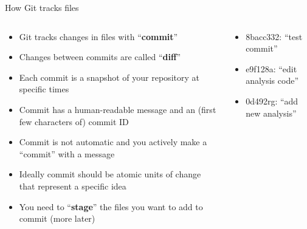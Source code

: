 \documentclass[handout,pdftex,10pt,aspectratio=169]{beamer}
\begin{document}
\begin{frame}{How Git tracks files}
  \begin{columns}[c]
    \begin{column}{0.46\linewidth}
      \begin{itemize}[<+->] \setlength\itemsep{10pt}
        \item Git tracks changes in files with ``\textbf{commit}''
        \item Changes between commits are called ``\textbf{diff}''
        \item Each commit is a snapshot of your repository at specific times
        \item Commit has a human-readable message and an (first few characters of) commit ID
        \item Commit is not automatic and you actively make a ``commit'' with a message
        \item Ideally commit should be atomic units of change that represent a specific idea
        \item You need to ``\textbf{stage}'' the files you want to add to commit (more later)
      \end{itemize}
    \end{column} \hfill
    \begin{column}{0.53\linewidth}
      \centering
      \begin{itemize}
        \item<4-> 8bacc332: ``test commit''
        \item<4-> e9f128a: ``edit analysis code''
        \item<4-> 0d492rg: ``add new analysis''
      \end{itemize}
    \end{column}
  \end{columns}    
\end{frame}
\end{document}
